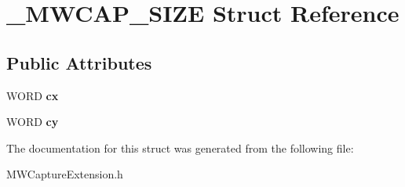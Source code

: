 \hypertarget{struct__MWCAP__SIZE}{\section{\-\_\-\-M\-W\-C\-A\-P\-\_\-\-S\-I\-Z\-E Struct Reference}
\label{struct__MWCAP__SIZE}
}
\subsection*{Public Attributes}
\begin{DoxyCompactItemize}
\item 
\hypertarget{struct__MWCAP__SIZE_ac5ef9e4dc0473669941ff7e004fa3450}{W\-O\-R\-D {\bfseries cx}}\label{struct__MWCAP__SIZE_ac5ef9e4dc0473669941ff7e004fa3450}

\item 
\hypertarget{struct__MWCAP__SIZE_a37e78f783d56ef428a2be15c5ecddeb5}{W\-O\-R\-D {\bfseries cy}}\label{struct__MWCAP__SIZE_a37e78f783d56ef428a2be15c5ecddeb5}

\end{DoxyCompactItemize}


The documentation for this struct was generated from the following file\-:\begin{DoxyCompactItemize}
\item 
M\-W\-Capture\-Extension.\-h\end{DoxyCompactItemize}
